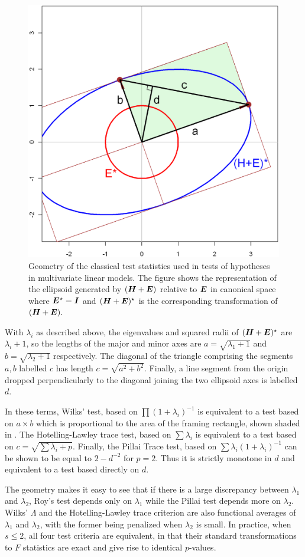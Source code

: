 \begin{figure}[htb]
  \centering
  \includegraphics[width=.5\textwidth,clip]{fig/mtests}
  \caption{Geometry of the classical test statistics used in tests of hypotheses in multivariate linear models.
  The figure shows the representation of the ellipsoid generated by $(\bm{H} + \bm{E})$ relative to $\bm{E}$
  in canonical space where $\bm{E}^\star = \bm{I}$ and $(\bm{H}+\bm{E})^\star$ is the corresponding transformation
  of $(\bm{H} + \bm{E}).$
  }%
  \label{fig:mtests}
\end{figure}

With $\lambda_i$ as described above, 
the eigenvalues and squared radii of $(\bm{H}+\bm{E})^\star$ are $\lambda_i + 1$,
so the lengths of the major and minor axes are  $a=\sqrt{\lambda_1 + 1}$ and $b=\sqrt{\lambda_2 + 1}$ respectively.
The diagonal of the triangle comprising the segments $a, b$ labelled $c$ has length
$c = \sqrt{a^2 + b^2}$.
Finally, a line segment from the origin dropped perpendicularly to the diagonal joining the two ellipsoid axes is labelled $d$.

In these terms, 
Wilks' test, based on $\prod{(1+\lambda_i)^{-1}}$ is equivalent to a test based on
$a \times b$ which is proportional to the area of the framing rectangle, shown shaded in .
The Hotelling-Lawley trace test, based on
$\sum{\lambda_i}$ 
is equivalent to a test based on 
$c=\sqrt{\sum{\lambda_i} + p}$.
Finally, the Pillai Trace test, based on $\sum{\lambda_i (1+\lambda_i)^{-1}}$  can be shown to be equal to 
$2-d^{-2}$ for $p=2$. Thus it is strictly monotone in $d$ and equivalent to a test based directly on $d$.

The geometry makes it easy to see that if there is a large discrepancy between $\lambda_1$ and $\lambda_2$, Roy's test depends 
only on $\lambda_1$ 
while the Pillai test depends more on $\lambda_2$. 
Wilks' $\Lambda$ and the Hotelling-Lawley trace criterion are also functional averages of $\lambda_1$ and $\lambda_2$, with the 
former being penalized when $\lambda_2$ is small.  In practice, when $s \le 2$, all four test criteria are equivalent, in that
their standard transformations to $F$ statistics are exact and give rise to identical $p$-values.




